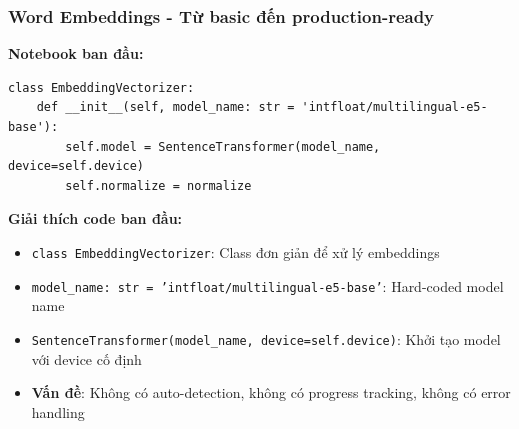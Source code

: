 \subsubsection{Word Embeddings - Từ basic đến production-ready}

\textbf{Notebook ban đầu:}
\begin{verbatim}
class EmbeddingVectorizer:
    def __init__(self, model_name: str = 'intfloat/multilingual-e5-base'):
        self.model = SentenceTransformer(model_name, device=self.device)
        self.normalize = normalize
\end{verbatim}

\textbf{Giải thích code ban đầu:}
\begin{itemize}
    \item \texttt{class EmbeddingVectorizer}: Class đơn giản để xử lý embeddings
    \item \texttt{model\_name: str = 'intfloat/multilingual-e5-base'}: Hard-coded model name
    \item \texttt{SentenceTransformer(model\_name, device=self.device)}: Khởi tạo model với device cố định
    \item \textbf{Vấn đề}: Không có auto-detection, không có progress tracking, không có error handling
\end{itemize}

